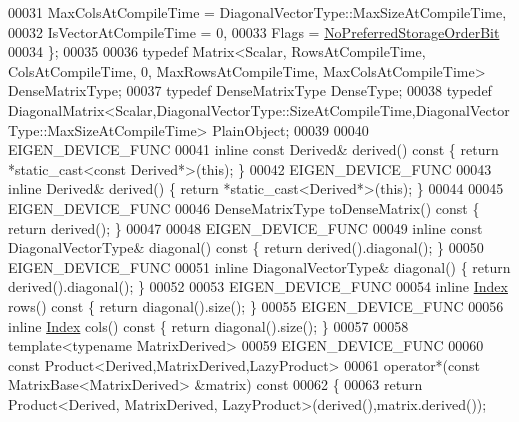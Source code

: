 \begin{DoxyCode}
00031       MaxColsAtCompileTime = DiagonalVectorType::MaxSizeAtCompileTime,
00032       IsVectorAtCompileTime = 0,
00033       Flags = \hyperlink{group__flags_ga3c186ad80ddcf5e2ed3d7ee31cca1860}{NoPreferredStorageOrderBit}
00034     \};
00035 
00036     \textcolor{keyword}{typedef} Matrix<Scalar, RowsAtCompileTime, ColsAtCompileTime, 0, MaxRowsAtCompileTime,
       MaxColsAtCompileTime> DenseMatrixType;
00037     \textcolor{keyword}{typedef} DenseMatrixType DenseType;
00038     \textcolor{keyword}{typedef} 
      DiagonalMatrix<Scalar,DiagonalVectorType::SizeAtCompileTime,DiagonalVectorType::MaxSizeAtCompileTime> PlainObject;
00039 
00040     EIGEN\_DEVICE\_FUNC
00041     \textcolor{keyword}{inline} \textcolor{keyword}{const} Derived& derived()\textcolor{keyword}{ const }\{ \textcolor{keywordflow}{return} *\textcolor{keyword}{static\_cast<}\textcolor{keyword}{const }Derived*\textcolor{keyword}{>}(\textcolor{keyword}{this}); \}
00042     EIGEN\_DEVICE\_FUNC
00043     \textcolor{keyword}{inline} Derived& derived() \{ \textcolor{keywordflow}{return} *\textcolor{keyword}{static\_cast<}Derived*\textcolor{keyword}{>}(\textcolor{keyword}{this}); \}
00044 
00045     EIGEN\_DEVICE\_FUNC
00046     DenseMatrixType toDenseMatrix()\textcolor{keyword}{ const }\{ \textcolor{keywordflow}{return} derived(); \}
00047     
00048     EIGEN\_DEVICE\_FUNC
00049     \textcolor{keyword}{inline} \textcolor{keyword}{const} DiagonalVectorType& diagonal()\textcolor{keyword}{ const }\{ \textcolor{keywordflow}{return} derived().diagonal(); \}
00050     EIGEN\_DEVICE\_FUNC
00051     \textcolor{keyword}{inline} DiagonalVectorType& diagonal() \{ \textcolor{keywordflow}{return} derived().diagonal(); \}
00052 
00053     EIGEN\_DEVICE\_FUNC
00054     \textcolor{keyword}{inline} \hyperlink{group___core___module_a554f30542cc2316add4b1ea0a492ff02}{Index} rows()\textcolor{keyword}{ const }\{ \textcolor{keywordflow}{return} diagonal().size(); \}
00055     EIGEN\_DEVICE\_FUNC
00056     \textcolor{keyword}{inline} \hyperlink{group___core___module_a554f30542cc2316add4b1ea0a492ff02}{Index} cols()\textcolor{keyword}{ const }\{ \textcolor{keywordflow}{return} diagonal().size(); \}
00057 
00058     \textcolor{keyword}{template}<\textcolor{keyword}{typename} MatrixDerived>
00059     EIGEN\_DEVICE\_FUNC
00060     \textcolor{keyword}{const} Product<Derived,MatrixDerived,LazyProduct>
00061     operator*(\textcolor{keyword}{const} MatrixBase<MatrixDerived> &matrix)\textcolor{keyword}{ const}
00062 \textcolor{keyword}{    }\{
00063       \textcolor{keywordflow}{return} Product<Derived, MatrixDerived, LazyProduct>(derived(),matrix.derived());

\end{DoxyCode}

